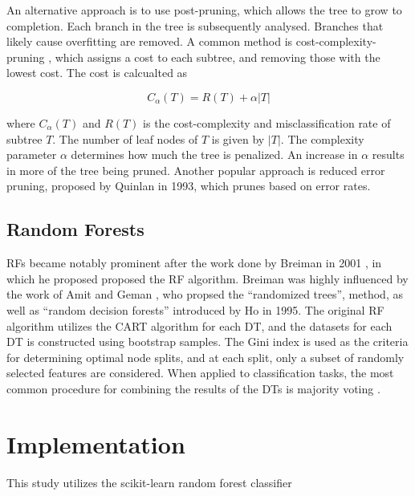 \documentclass[conference]{IEEEtran}
\begin{document}
        An alternative approach is to use post-pruning, which allows the tree to grow to completion. Each branch in the
        tree is subsequently analysed. Branches that likely cause overfitting are removed. A common method is
        cost-complexity-pruning \cite{Breiman1984}, which assigns a cost to each subtree, and removing those with the lowest cost.
        The cost is calcualted as

        \begin{equation}
            C_\alpha(T) = R(T) + \alpha |T|
        \end{equation}
            
        where $C_\alpha(T)$ and $R(T)$ is the cost-complexity and misclassification rate of subtree $T$. The number of leaf nodes
        of $T$ is given by $|T|$. The complexity parameter $\alpha$ determines how much the tree is penalized. An increase in
        $\alpha$ results in more of the tree being pruned. Another popular approach is reduced error pruning, proposed by 
        Quinlan \cite{DT_quinlan1993} in 1993, which prunes based on error rates.

    \subsection{Random Forests}

        RFs became notably prominent after the work done by Breiman in 2001 \cite{breiman2001random}, in which he proposed
        proposed the RF algorithm. Breiman was highly influenced by the work of Amit and Geman \cite{amit1997shape}, who propsed the ``randomized trees'',
        method, as well as ``random decision forests'' introduced by Ho in 1995. The original RF algorithm \cite{breiman2001random}
        utilizes the CART algorithm for each DT, and the datasets for each DT is constructed using bootstrap samples. The Gini index
        is used as the criteria for determining optimal node splits, and at each split, only a subset of randomly selected features are considered.
        When applied to classification tasks, the most common procedure for combining the results of the DTs is majority voting \cite{SUN2024121549}.
        

\section{Implementation} \label{Implementation}

    This study utilizes the scikit-learn \cite{scikit-learn} random forest classifier
    
\end{document}

